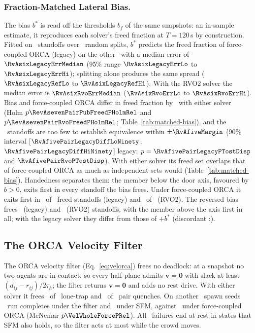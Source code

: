 \subsubsection{Fraction-Matched Lateral Bias.}
The bias $b^\ast$ is read off the thresholds $b_f$ of the same snapshots: an in-sample estimate, it reproduces each solver's freed fraction at $T=120$\,s by construction. Fitted on \RvAsixNHalf\ standoffs over \RvAsixNSplits\ random splits, $b^\ast$ predicts the freed fraction of force-coupled ORCA (legacy) on the other \RvAsixNHalf\ with a median error of $\RvAsixLegacyErrMedian$ (95\% range $\RvAsixLegacyErrLo$ to $\RvAsixLegacyErrHi$); splitting alone produces the same spread ($\RvAsixLegacyRefLo$ to $\RvAsixLegacyRefHi$). With the RVO2 solver the median error is $\RvAsixRvoErrMedian$ ($\RvAsixRvoErrLo$ to $\RvAsixRvoErrHi$). Bias and force-coupled ORCA differ in freed fraction by \PscrPairPubDiff\ with either solver (Holm $p\RevAsevenPairPubFreedPHolmRel$ and $p\RevAsevenPairRvoFreedPHolmRel$; Table~\ref{tab:matched-bias}), and the \PairN\ standoffs are too few to establish equivalence within $\pm\RvAfiveMargin$ (90\% interval [$\RvAfivePairLegacyDiffLoNinety$, $\RvAfivePairLegacyDiffHiNinety$] legacy; $p=\RvAfivePairLegacyPTostDisp$ and $\RvAfivePairRvoPTostDisp$).
With either solver its freed set overlaps that of force-coupled ORCA as much as independent sets would (Table~\ref{tab:matched-bias}). Handedness separates them: the member below the door axis, favoured by $b>0$, exits first in every standoff the bias frees. Under force-coupled ORCA it exits first in \PairPubLower\ of \PairPubFreed\ freed standoffs (legacy) and \TabThreePairRvoOrcaLower\ of \PairRvoFreed\ (RVO2). The reversed bias frees \PairBsPubMinusFreed\ (legacy) and \PscrPairBsRvoMinusFreed\ (RVO2) standoffs, with the member above the axis first in all; with the legacy solver they differ from those of $+b^\ast$ (discordant \PairBsPubRevA:\PairBsPubRevB).

\subsection{The ORCA Velocity Filter}\label{sec:velorca}
The ORCA velocity filter (Eq.~\eqref{eq:velorca}) frees no deadlock: at a snapshot no two agents are in contact, so every half-plane admits $\mathbf v=\mathbf 0$ with slack at least $(d_{ij}-r_{ij})/2\tau_h$; the filter returns $\mathbf v=\mathbf 0$ and adds no rest drive. With either solver it frees \VelLoneRvoK\ of \VelLoneN\ lone-trap and \VelPairRvoK\ of \VelPairN\ pair quenches. On another \VelWholeN\ spawn seeds \VelWholeK\ run completes under the filter and \VelWholeSfmK\ under SFM, against \VelWholeForceK\ under force-coupled ORCA (McNemar $p\VelWholeForcePRel$). All \VelWholeFail\ failures end at rest in states that SFM also holds, so the filter acts at most while the crowd moves.
